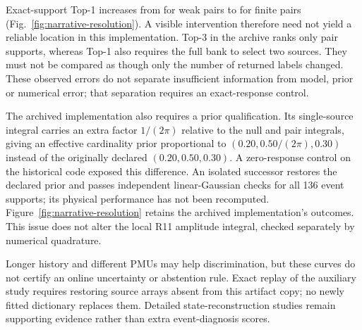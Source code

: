 Exact-support Top-1 increases from \GlobalWeakTopOne{} for weak pairs to
\GlobalFiniteTopOne{} for finite pairs (Fig.~\ref{fig:narrative-resolution}).
A visible intervention therefore need not yield a reliable location in
this implementation. Top-3 in the archive ranks only pair supports,
whereas Top-1 also requires the full bank to select two sources. They
must not be compared as though only the number of returned labels changed.
These observed errors do not separate insufficient information from model,
prior or numerical error; that separation requires an exact-response control.

The archived implementation also requires a prior qualification. Its
single-source integral carries an extra factor $1/(2\pi)$ relative to
the null and pair integrals, giving an effective cardinality prior
proportional to $(0.20,0.50/(2\pi),0.30)$ instead of the originally
declared $(0.20,0.50,0.30)$. A zero-response control on the historical
code exposed this difference. An isolated successor restores the declared
prior and passes independent linear-Gaussian checks for all 136 event
supports; its physical performance has not been recomputed. Figure~\ref{fig:narrative-resolution}
retains the archived implementation's outcomes. This issue does not alter
the local R11 amplitude integral, checked separately
by numerical quadrature.

Longer history and different PMUs may help discrimination, but these
curves do not certify an online uncertainty or abstention rule. Exact
replay of the auxiliary study requires restoring source arrays absent
from this artifact copy; no newly fitted dictionary replaces them.
Detailed state-reconstruction studies remain supporting evidence rather
than extra event-diagnosis scores.
